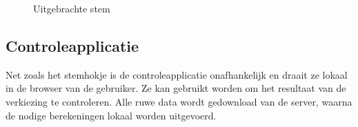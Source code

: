 \begin{figure}
  \caption{Uitgebrachte stem}
  \label{fig:helios:cast_vote}
\end{figure}

\subsection{Controleapplicatie}
\label{sec:helios:controleapplicatie}

Net zoals het stemhokje is de controleapplicatie onafhankelijk en draait ze lokaal in de browser van de gebruiker. Ze kan gebruikt worden om het resultaat van de verkiezing te controleren. Alle ruwe data wordt gedownload van de server, waarna de nodige berekeningen lokaal worden uitgevoerd.
